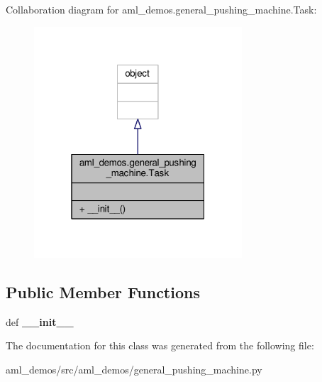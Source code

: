 Collaboration diagram for aml\-\_\-demos.\-general\-\_\-pushing\-\_\-machine.\-Task\-:
\nopagebreak
\begin{figure}[H]
\begin{center}
\leavevmode
\includegraphics[width=220pt]{classaml__demos_1_1general__pushing__machine_1_1_task__coll__graph}
\end{center}
\end{figure}
\subsection*{Public Member Functions}
\begin{DoxyCompactItemize}
\item 
\hypertarget{classaml__demos_1_1general__pushing__machine_1_1_task_abfe4befda19fbe9dacaba32ed17d2b1c}{def {\bfseries \-\_\-\-\_\-init\-\_\-\-\_\-}}\label{classaml__demos_1_1general__pushing__machine_1_1_task_abfe4befda19fbe9dacaba32ed17d2b1c}

\end{DoxyCompactItemize}


The documentation for this class was generated from the following file\-:\begin{DoxyCompactItemize}
\item 
aml\-\_\-demos/src/aml\-\_\-demos/general\-\_\-pushing\-\_\-machine.\-py\end{DoxyCompactItemize}
